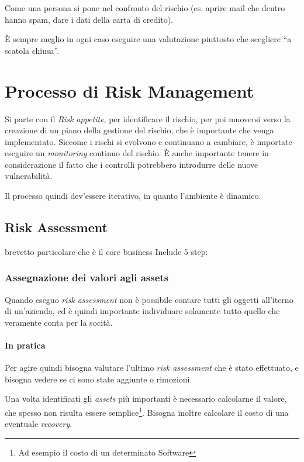 Come una persona si pone nel confronto del rischio (es. aprire mail che dentro
hanno spam, dare i dati della carta di credito).

È sempre meglio in ogni caso eseguire una valutazione piuttosto che scegliere
``a scatola chiusa''.


\section{Processo di Risk Management}

Si parte con il \textit{Risk appetite}, per identificare il rischio, per poi
muoversi verso la creazione di un piano della gestione del rischio, che è
importante che venga implementato. Siccome i rischi si evolvono e continuano a
cambiare, è importate eseguire un \textit{monitoring} continuo del rischio. È
anche importante tenere in considerazione il fatto che i controlli potrebbero
introdurre delle nuove vulnerabilità.

Il processo quindi dev'essere iterativo, in quanto l'ambiente è dinamico.


\subsection{Risk Assessment}
brevetto particolare che è il core business
Include 5 step:

\subsubsection{Assegnazione dei valori agli assets}

Quando eseguo \textit{risk assessment} non è possibile contare tutti gli oggetti
all'iterno di un'azienda, ed è quindi importante individuare solamente tutto
quello che veramente conta per la socità.

\paragraph*{In pratica}

Per agire quindi bisogna valutare l'ultimo \textit{risk assessment} che è stato
effettuato, e bisogna vedere se ci sono state aggiunte o rimozioni.

Una volta identificati gli \textit{assets} più importanti è necessario
calcolarne il valore, che spesso non risulta essere semplice\footnote{Ad esempio
il costo di un determinato Software}. Bisogna inoltre calcolare il costo di una
eventuale \textit{recovery}.




